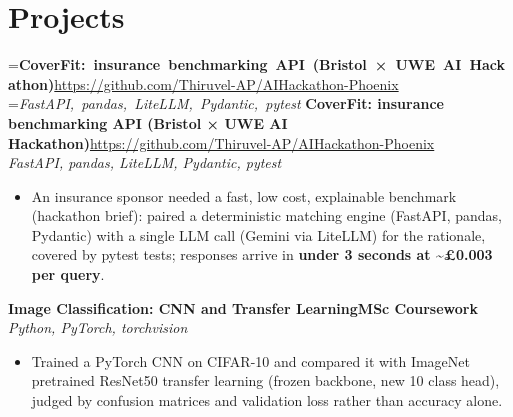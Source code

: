 \documentclass[a4paper,11pt]{article}
\newcommand{\project}[3]{%
  \textbf{#1}\hfill#3\\ {\color{muted}\small\textit{#2}}\par}
\newcommand{\badge}[1]{{\color{navy}\small\textbf{#1}}}
\newcommand{\gap}{\vspace{5pt}}
\newcommand{\num}[1]{\textbf{#1}}   %
\begin{document}
\section{Projects}
=\hbox{\textbf{CoverFit: insurance benchmarking API (Bristol × UWE AI Hackathon)}\hspace{1em}\url{https://github.com/Thiruvel-AP/AIHackathon-Phoenix}}%
=\hbox{{\small\textit{FastAPI, pandas, LiteLLM, Pydantic, pytest}}}%
\ifdim\wd0>\linewidth
\ifdim\wd2>\linewidth
\textbf{CoverFit: insurance benchmarking API (Bristol × UWE AI Hackathon)}\\ {\color{muted}\small\textit{FastAPI, pandas, LiteLLM, Pydantic, pytest}}\\ \hfill{\small\url{https://github.com/Thiruvel-AP/AIHackathon-Phoenix}}\par
\else
\textbf{CoverFit: insurance benchmarking API (Bristol × UWE AI Hackathon)}\\ {\color{muted}\small\textit{FastAPI, pandas, LiteLLM, Pydantic, pytest}}\hfill{\small\url{https://github.com/Thiruvel-AP/AIHackathon-Phoenix}}\par
\fi
\else
\project{CoverFit: insurance benchmarking API (Bristol × UWE AI Hackathon)}{FastAPI, pandas, LiteLLM, Pydantic, pytest}{\url{https://github.com/Thiruvel-AP/AIHackathon-Phoenix}}
\fi
\begin{itemize}
  \item An insurance sponsor needed a fast, low cost, explainable benchmark (hackathon brief): paired a deterministic matching engine (FastAPI, pandas, Pydantic) with a single LLM call (Gemini via LiteLLM) for the rationale, covered by pytest tests; responses arrive in \num{under 3 seconds at \textasciitilde{}£0.003 per query}.
\end{itemize}
\gap
{}
\project{Image Classification: CNN and Transfer Learning}{Python, PyTorch, torchvision}{\badge{MSc Coursework}}
\begin{itemize}
  \item Trained a PyTorch CNN on CIFAR-10 and compared it with ImageNet pretrained ResNet50 transfer learning (frozen backbone, new 10 class head), judged by confusion matrices and validation loss rather than accuracy alone.
\end{itemize}
\end{document}

